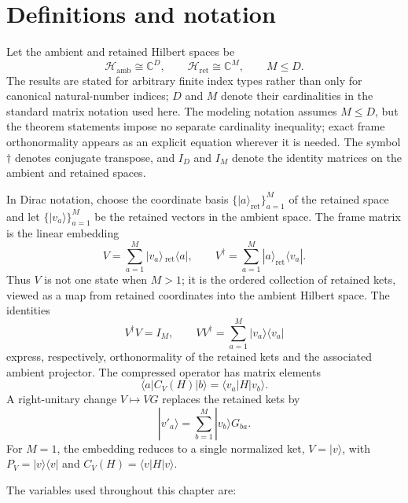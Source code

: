 \section{Definitions and notation}

Let the ambient and retained Hilbert spaces be
\[
  \mathcal H_{\mathrm{amb}}\cong\mathbb C^D,
  \qquad
  \mathcal H_{\mathrm{ret}}\cong\mathbb C^M,
  \qquad M\leq D.
\]
The results are stated for arbitrary finite index types rather than only for canonical
natural-number indices; $D$ and $M$ denote their cardinalities in the standard matrix
notation used here. The modeling notation assumes $M\leq D$, but the theorem statements
impose no separate cardinality inequality; exact frame orthonormality appears as an
explicit equation wherever it is needed.  The symbol $\dagger$ denotes conjugate
transpose, and $I_D$ and $I_M$ denote the identity matrices on the ambient and retained
spaces.

In Dirac notation, choose the coordinate basis
$\{|a\rangle_{\mathrm{ret}}\}_{a=1}^M$ of the retained space and let
$\{|v_a\rangle\}_{a=1}^M$ be the retained vectors in the ambient space. The frame matrix
is the linear embedding
\[
  V=\sum_{a=1}^M |v_a\rangle\,{}_{\mathrm{ret}}\!\langle a|,
  \qquad
  V^\dagger=\sum_{a=1}^M |a\rangle_{\mathrm{ret}}\langle v_a|.
\]
Thus $V$ is not one state when $M>1$; it is the ordered collection of retained kets,
viewed as a map from retained coordinates into the ambient Hilbert space. The identities
\[
  V^\dagger V=I_M,
  \qquad
  VV^\dagger=\sum_{a=1}^M |v_a\rangle\langle v_a|
\]
express, respectively, orthonormality of the retained kets and the associated ambient
projector. The compressed operator has matrix elements
\[
  \langle a|C_V(H)|b\rangle
  =\langle v_a|H|v_b\rangle.
\]
A right-unitary change $V\mapsto VG$ replaces the retained kets by
\[
  |v'_a\rangle=\sum_{b=1}^M |v_b\rangle G_{ba}.
\]
For $M=1$, the embedding reduces to a single normalized ket, $V=|v\rangle$, with
$P_V=|v\rangle\langle v|$ and $C_V(H)=\langle v|H|v\rangle$.

The variables used throughout this chapter are:

